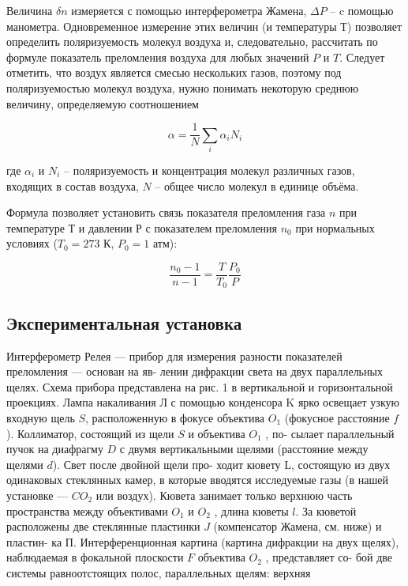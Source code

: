 \documentclass[a4paper,12pt]{article}
\theoremstyle{definition}
\begin{document}
\par Величина $\delta n$ измеряется с помощью интерферометра Жамена, $\Delta P$ --
c помощью манометра. Одновременное измерение этих величин (и температуры $Т$)
позволяет определить поляризуемость молекул воздуха и, следовательно, рассчитать 
по формуле показатель преломления воздуха для любых значений $P$ и $T$.
Следует отметить, что воздух является смесью нескольких газов, поэтому под 
поляризуемостью молекул воздуха, нужно понимать некоторую среднюю величину,
определяемую соотношением

$$\alpha = \dfrac{1}{N} \sum_{i} \alpha_{i} N_i$$

где $\alpha_{i}$ и $N_i$ -- поляризуемость и концентрация молекул различных газов, 
входящих в состав воздуха, $N$ -- общее число молекул в единице объёма.

\par Формула позволяет установить связь показателя преломления газа $n$ при
температуре $Т$ и давлении $Р$ с показателем преломления $n_0$ при нормальных условиях ($T_0 = 273$ К, $P_0 = 1$ атм):

$$ \dfrac{n_0 - 1}{n - 1} = \dfrac{T}{T_0} \dfrac{P_0}{P} $$

\subsection*{Экспериментальная установка}
\par Интерферометр Релея — прибор
для измерения разности показателей преломления — основан на яв-
лении дифракции света на двух параллельных щелях. Схема прибора
представлена на рис. 1 в вертикальной и горизонтальной проекциях.
Лампа накаливания Л с помощью конденсора K ярко освещает узкую
входную щель $S$, расположенную в фокусе объектива $O_1$ (фокусное
расстояние $f$). Коллиматор, состоящий из щели $S$ и объектива $O_1$ , по-
сылает параллельный пучок на диафрагму $D$ с двумя вертикальными
щелями (расстояние между щелями $d$). Свет после двойной щели про-
ходит кювету L, состоящую из двух одинаковых стеклянных камер, в
которые вводятся исследуемые газы (в нашей установке — $CO_2$ или
воздух). Кювета занимает только верхнюю часть пространства между
объективами $O_1$ и $O_2$ , длина кюветы $l$. За кюветой расположены две
стеклянные пластинки $J$ (компенсатор Жамена, см. ниже) и пластин-
ка П.
Интерференционная картина (картина дифракции на двух щелях),
наблюдаемая в фокальной плоскости $F$ объектива $O_2$ , представляет со-
бой две системы равноотстоящих полос, параллельных щелям: верхняя
\end{document}
